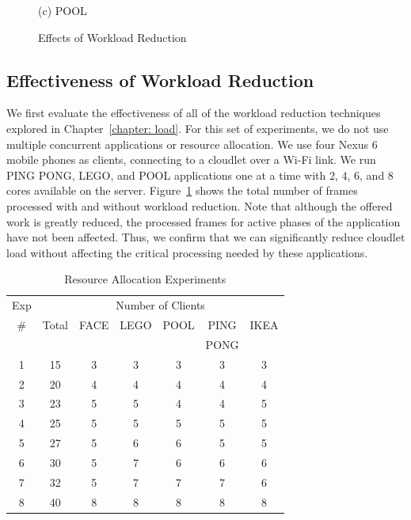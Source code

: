 \begin{figure}
\begin{minipage}[b]{0.3\linewidth}
{(c) POOL}
\end{minipage}
\caption{Effects of Workload Reduction}
\label{figs:workload-reduction}
\end{figure}


\subsection{Effectiveness of Workload Reduction}

We first evaluate the effectiveness of all of the workload reduction techniques
explored in Chapter~\ref{chapter: load}. For this set of experiments, we do not
use multiple concurrent applications or resource allocation. We use four Nexus 6
mobile phones as clients, connecting to a cloudlet over a Wi-Fi link. We run
PING PONG, LEGO, and POOL applications one at a time with 2, 4, 6, and 8 cores
available on the server. Figure~\ref{figs:workload-reduction} shows the total
number of frames processed with and without workload reduction. Note that
although the offered work is greatly reduced, the processed frames for active
phases of the application have not been affected. Thus, we confirm that we can
significantly reduce cloudlet load without affecting the critical processing
needed by these applications.

\begin{table}[]
\centering
\begin{tabular}{|c|c||c|c|c|c|c|}
  \hline
  Exp & \multicolumn{6}{|c|}{Number of Clients} \\
  \cline{2-7}
  \#  & Total & FACE & LEGO & POOL & PING & IKEA \\
      &      &   &   &  & PONG &  \\ \hline
  1   & 15  & 3 & 3 & 3 & 3 & 3 \\ \hline
  2   & 20  & 4 & 4 & 4 & 4 & 4 \\ \hline
  3   & 23  & 5 & 5 & 4 & 4 & 5\\ \hline
  4   & 25  & 5 & 5 & 5 & 5 & 5 \\ \hline
  5   & 27  & 5 & 6 & 6 & 5 & 5 \\ \hline
  6  & 30  & 5 & 7 & 6 & 6 & 6 \\ \hline
  7  & 32  & 5 & 7 & 7 & 7 & 6 \\ \hline
  8  & 40  & 8 & 8 & 8 & 8 & 8 \\ \hline
\end{tabular}
\vspace{0.1in}
\caption{Resource Allocation Experiments} 
\label{tab:alloc-exps}
\end{table}

